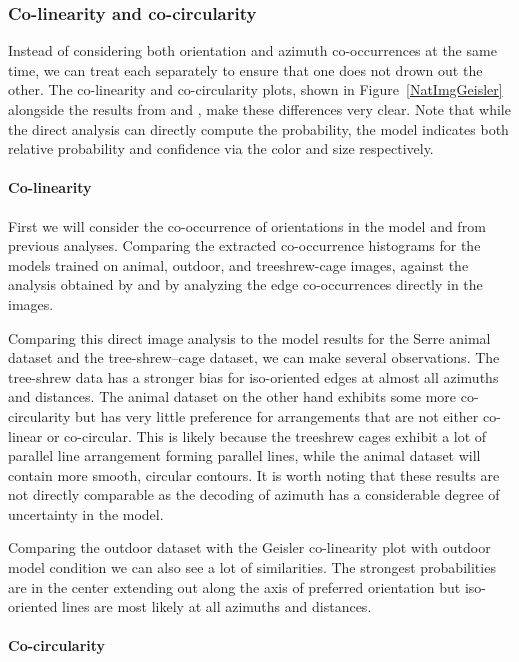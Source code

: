 \subsubsection*{Co-linearity and co-circularity}

Instead of considering both orientation and azimuth co-occurrences at
the same time, we can treat each separately to ensure that one does
not drown out the other. The co-linearity and co-circularity plots,
shown in Figure~\ref{NatImgGeisler} alongside the results from
\cite{Geisler2001} and \cite{Perrinet2015}, make these differences
very clear. Note that while the direct analysis can directly compute
the probability, the model indicates both relative probability and
confidence via the color and size respectively.

\paragraph{Co-linearity}

First we will consider the co-occurrence of orientations in the model
and from previous analyses. Comparing the extracted co-occurrence
histograms for the models trained on animal, outdoor, and
treeshrew-cage images, against the analysis obtained by
\cite{Perrinet2015} and \cite{Geisler2001} by analyzing the edge
co-occurrences directly in the images.

Comparing this direct image analysis to the model results for the
Serre animal dataset and the tree-shrew--cage dataset, we can make
several observations. The tree-shrew data has a stronger bias for
iso-oriented edges at almost all azimuths and distances. The animal
dataset on the other hand exhibits some more co-circularity but has
very little preference for arrangements that are not either co-linear
or co-circular. This is likely because the treeshrew cages exhibit a
lot of parallel line arrangement forming parallel lines, while the
animal dataset will contain more smooth, circular contours. It is
worth noting that these results are not directly comparable as the
decoding of azimuth has a considerable degree of uncertainty in the
model.

Comparing the outdoor dataset with the Geisler co-linearity plot with
outdoor model condition we can also see a lot of similarities. The
strongest probabilities are in the center extending out along the axis
of preferred orientation but iso-oriented lines are most likely at all
azimuths and distances.

\paragraph{Co-circularity}

